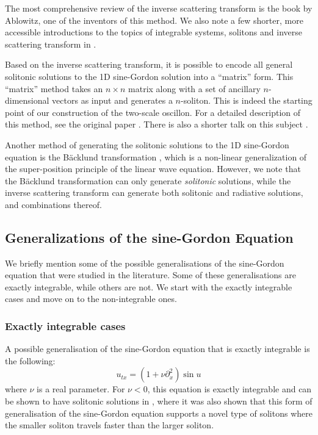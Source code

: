 \documentclass{report}
\begin{document}
The most comprehensive review of the inverse scattering transform is the book \cite{ablowitz} by Ablowitz, one of the inventors of this method. We also note a few shorter, more accessible introductions to the topics of integrable systems, solitons and inverse scattering transform in \cite{Aktosun2009, spiro, intsys}.

Based on the inverse scattering transform, it is possible to encode all general solitonic solutions to the 1D sine-Gordon solution into a ``matrix'' form. This ``matrix'' method takes an $n\times n$ matrix along with a set of ancillary $n$-dimensional vectors as input and generates a $n$-soliton. This is indeed the starting point of our construction of the two-scale oscillon. For a detailed description of this method, see the original paper \cite{:/content/aip/journal/jmp/51/12/10.1063/1.3520596}. There is also a shorter talk on this subject \cite{sgtalk}.

Another method of generating the solitonic solutions to the 1D sine-Gordon equation is the B\"acklund transformation \cite{Dodd499, hietarinta1997introduction, Cuenda20111047}, which is a non-linear generalization of the super-position principle of the linear wave equation. However, we note that the B\"acklund transformation can only generate \emph{solitonic} solutions, while the inverse scattering transform can generate both solitonic and radiative solutions, and combinations thereof.

\subsection{Generalizations of the sine-Gordon Equation}
We briefly mention some of the possible generalisations of the sine-Gordon equation that were studied in the literature. Some of these generalisations are exactly integrable, while others are not. We start with the exactly integrable cases and move on to the non-integrable ones.

\subsubsection{Exactly integrable cases}
A possible generalisation of the sine-Gordon equation that is exactly integrable \cite{1751-8121-43-10-105204} is the following:
\begin{equation}
  u_{tx} = (1+\nu \partial^2_x)\sin u
\end{equation}
where $\nu$ is a real parameter. For $\nu<0$, this equation is exactly integrable and can be shown to have solitonic solutions in \cite{1751-8121-43-10-105204}, where it was also shown that this form of generalisation of the sine-Gordon equation supports a novel type of solitons where the smaller soliton travels faster than the larger soliton.
\end{document}
